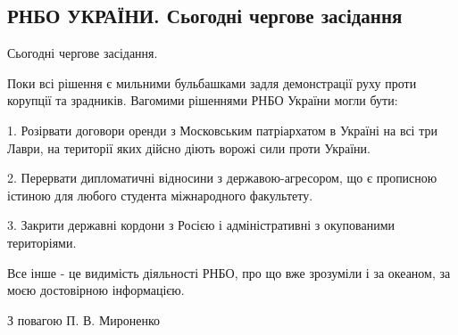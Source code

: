  
 
 
 
 

\subsection{РНБО УКРАЇНИ.  Сьогодні чергове засідання}
\label{sec:15_04_2021.fb.mironenko_petr.1.rnbo}

Сьогодні чергове засідання.

Поки всі рішення є мильними бульбашками задля демонстрації руху проти корупції
та зрадників.  Вагомими рішеннями РНБО України могли бути:

1. Розірвати договори оренди з Московським патріархатом в Україні на всі три Лаври, на території яких дійсно діють ворожі сили проти України.

2. Перервати дипломатичні відносини з державою-агресором, що є прописною істиною для любого студента міжнародного факультету.

3. Закрити державні кордони з Росією і адміністративні з окупованими територіями.

Все інше - це видимість діяльності РНБО, про що вже зрозуміли і за океаном, за
моєю достовірною інформацією.

З повагою П. В. Мироненко
